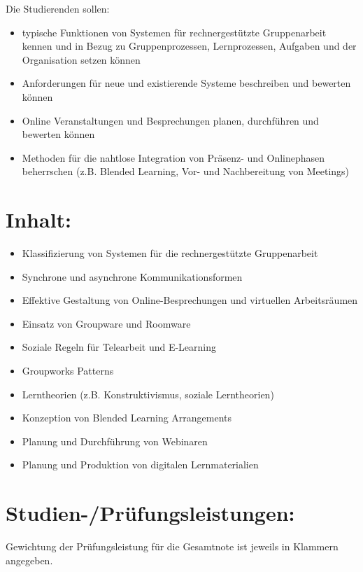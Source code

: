 Die Studierenden sollen:

\begin{itemize}
\tightlist
\item
  typische Funktionen von Systemen für rechnergestützte Gruppenarbeit
  kennen und in Bezug zu Gruppenprozessen, Lernprozessen, Aufgaben und
  der Organisation setzen können
\item
  Anforderungen für neue und existierende Systeme beschreiben und
  bewerten können
\item
  Online Veranstaltungen und Besprechungen planen, durchführen und
  bewerten können
\item
  Methoden für die nahtlose Integration von Präsenz- und Onlinephasen
  beherrschen (z.B. Blended Learning, Vor- und Nachbereitung von
  Meetings)
\end{itemize}

\section*{Inhalt:}\label{inhalt-13}

\begin{itemize}
\tightlist
\item
  Klassifizierung von Systemen für die rechnergestützte Gruppenarbeit
\item
  Synchrone und asynchrone Kommunikationsformen
\item
  Effektive Gestaltung von Online-Besprechungen und virtuellen
  Arbeitsräumen
\item
  Einsatz von Groupware und Roomware
\item
  Soziale Regeln für Telearbeit und E-Learning
\item
  Groupworks Patterns
\item
  Lerntheorien (z.B. Konstruktivismus, soziale Lerntheorien)
\item
  Konzeption von Blended Learning Arrangements
\item
  Planung und Durchführung von Webinaren
\item
  Planung und Produktion von digitalen Lernmaterialien
\end{itemize}

\section*{Studien-/Prüfungsleistungen:}\label{studien-pruxfcfungsleistungen-13}

Gewichtung der Prüfungsleistung für die Gesamtnote ist jeweils in
Klammern angegeben.


